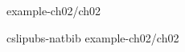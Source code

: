 
\begingroup %

 {example-ch02/}{ch02}     %

 {cslipubs-natbib}
 {example-ch02/ch02}  %

\endgroup

